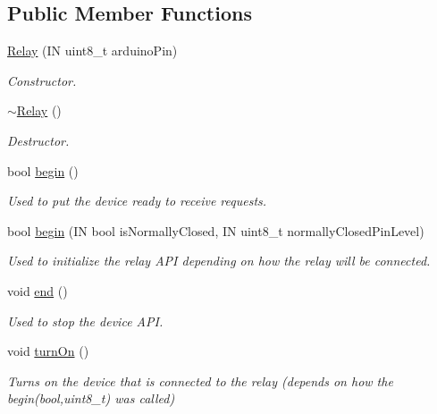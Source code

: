 \subsection*{Public Member Functions}
\begin{DoxyCompactItemize}
\item 
\hyperlink{class_easyuino_1_1_relay_a34a9e8461a4018e88ee49d956aca37f7}{Relay} (IN uint8\+\_\+t arduino\+Pin)
\begin{DoxyCompactList}\small\item\em Constructor. \end{DoxyCompactList}\item 
\mbox{\label{class_easyuino_1_1_relay_a05bb65f34a842d8b044d2f8d81c2f622}} 
\hyperlink{class_easyuino_1_1_relay_a05bb65f34a842d8b044d2f8d81c2f622}{$\sim$\+Relay} ()
\begin{DoxyCompactList}\small\item\em Destructor. \end{DoxyCompactList}\item 
bool \hyperlink{class_easyuino_1_1_relay_a920a0fa287cacfd8c6df19d8812d4958}{begin} ()
\begin{DoxyCompactList}\small\item\em Used to put the device ready to receive requests. \end{DoxyCompactList}\item 
bool \hyperlink{class_easyuino_1_1_relay_a05e66468ee1b991f394d9182b9886bf7}{begin} (IN bool is\+Normally\+Closed, IN uint8\+\_\+t normally\+Closed\+Pin\+Level)
\begin{DoxyCompactList}\small\item\em Used to initialize the relay A\+PI depending on how the relay will be connected. \end{DoxyCompactList}\item 
void \hyperlink{class_easyuino_1_1_relay_a2b57237c996a6ffe8e900ae273bce9d4}{end} ()
\begin{DoxyCompactList}\small\item\em Used to stop the device A\+PI. \end{DoxyCompactList}\item 
\mbox{\label{class_easyuino_1_1_relay_a28b594b3ee957e062630fa2c771a966d}} 
void \hyperlink{class_easyuino_1_1_relay_a28b594b3ee957e062630fa2c771a966d}{turn\+On} ()
\begin{DoxyCompactList}\small\item\em Turns on the device that is connected to the relay (depends on how the begin(bool,uint8\+\_\+t) was called) \end{DoxyCompactList}\item 

\end{DoxyCompactItemize}
